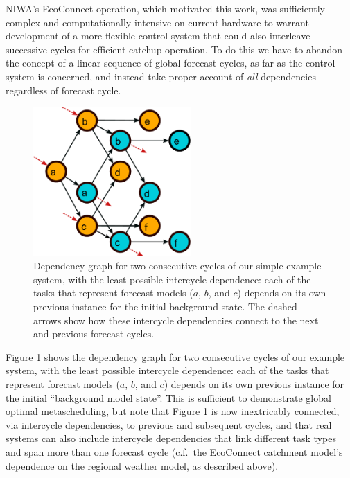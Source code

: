 \documentclass[11pt,a4paper]{article}
\begin{document}
NIWA's EcoConnect operation, which motivated this work, was sufficiently
complex and computationally intensive on current hardware to warrant
development of a more flexible control system that could also interleave
successive cycles for efficient catchup operation.  To do this we have
to abandon the concept of a linear sequence of global forecast cycles,
as far as the control system is concerned, and instead take proper
account of {\em all} dependencies regardless of forecast cycle. 
\begin{figure} \begin{center}
    \includegraphics[width=6cm]{dependencies-two} \end{center}
    \caption{\small Dependency graph for two consecutive cycles of our
    simple example system, with the least possible intercycle
    dependence: each of the tasks that represent forecast models ($a$,
    $b$, and $c$) depends on its own previous instance for the initial
    background state. The dashed arrows show how these intercycle
    dependencies connect to the next and previous forecast cycles.} 
    \label{fig-dep-two}
\end{figure}
Figure \ref{fig-dep-two} shows the dependency graph for two consecutive
cycles of our example system, with the least possible intercycle
dependence: each of the tasks that represent forecast models ($a$, $b$,
and $c$) depends on its own previous instance for the initial
``background model state''.  This is sufficient to demonstrate global
optimal metascheduling, but note that Figure \ref{fig-dep-two} is now
inextricably connected, via intercycle dependencies, to previous and
subsequent cycles, and that real systems can also include intercycle
dependencies that link different task types and span more than one
forecast cycle (c.f.\ the EcoConnect catchment model's dependence on the
regional weather model, as described above). 
\end{document}
